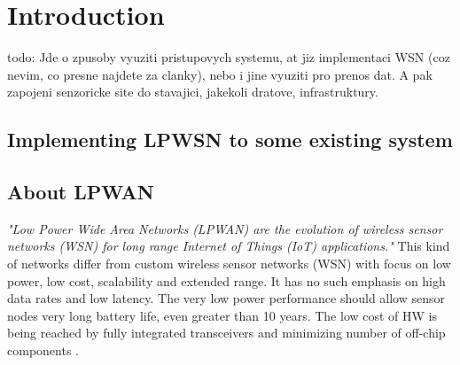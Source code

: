 \chapter{Introduction}

todo: Jde o zpusoby vyuziti pristupovych systemu, at jiz implementaci WSN (coz nevim, co presne najdete za clanky), nebo i jine vyuziti pro prenos dat. A pak zapojeni senzoricke site do stavajici, jakekoli dratove, infrastruktury.

\section{Implementing LPWSN to some existing system}




\section{About LPWAN}
\textit{"Low Power Wide Area Networks (LPWAN) are the
evolution of wireless sensor networks (WSN) for long
range Internet of Things (IoT) applications."} \cite{MURS Band for LPWAN Applications}
This kind of networks differ from custom wireless sensor networks (WSN) with focus on low power, low cost, scalability and extended range.
It has no such emphasis on high data rates and low latency.
The very low power performance should allow sensor nodes very long battery life, even greater than 10 years.
The low cost of HW is being reached by fully integrated transceivers and minimizing number of off-chip components \cite{MURS Band for LPWAN Applications}.


